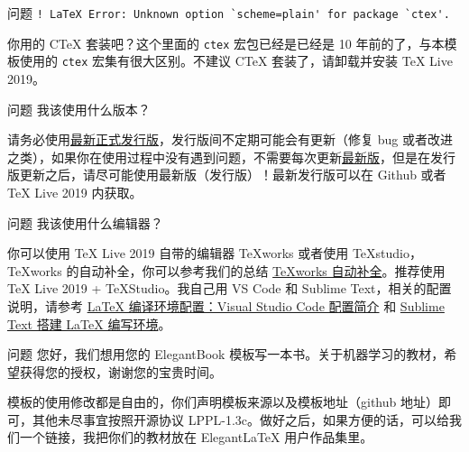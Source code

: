 	\begin{custom}{问题}
	\lstinline{! LaTeX Error: Unknown option `scheme=plain' for package `ctex'.}
	\end{custom}
	
	\begin{solution}
	你用的 C\TeX{} 套装吧？这个里面的 \lstinline{ctex} 宏包已经是已经是 10 年前的了，与本模板使用的 \lstinline{ctex} 宏集有很大区别。不建议 C\TeX{} 套装了，请卸载并安装 \TeX{} Live 2019。
	\end{solution}
	
	\begin{custom}{问题}
	我该使用什么版本？
	\end{custom}
	
	\begin{solution}
	请务必使用\href{https://github.com/ElegantLaTeX/ElegantBook/releases}{最新正式发行版}，发行版间不定期可能会有更新（修复 bug 或者改进之类），如果你在使用过程中没有遇到问题，不需要每次更新\href{https://github.com/ElegantLaTeX/ElegantBook/archive/master.zip}{最新版}，但是在发行版更新之后，请尽可能使用最新版（发行版）！最新发行版可以在 Github 或者 \TeX{} Live 2019 内获取。
	\end{solution}
	
	
	\begin{custom}{问题}
	我该使用什么编辑器？
	\end{custom}
	
	\begin{solution}
	你可以使用 \TeX{} Live 2019 自带的编辑器 \TeX{}works 或者使用 \TeX{}studio，\TeX works 的自动补全，你可以参考我们的总结 \href{https://github.com/EthanDeng/texworks-autocomplete}{\TeX works 自动补全}。推荐使用 \TeX{} Live 2019 + \TeX Studio。我自己用 VS Code 和 Sublime Text，相关的配置说明，请参考 \href{https://github.com/EthanDeng/vscode-latex}{\LaTeX{} 编译环境配置：Visual Studio Code 配置简介} 和 \href{https://github.com/EthanDeng/sublime-text-latex}{Sublime Text 搭建 \LaTeX{} 编写环境}。
	\end{solution}
	
	
	\begin{custom}{问题}
	您好，我们想用您的 ElegantBook 模板写一本书。关于机器学习的教材，希望获得您的授权，谢谢您的宝贵时间。
	\end{custom}
	
	\begin{solution}
	模板的使用修改都是自由的，你们声明模板来源以及模板地址（github 地址）即可，其他未尽事宜按照开源协议 LPPL-1.3c。做好之后，如果方便的话，可以给我们一个链接，我把你们的教材放在 ElegantLaTeX 用户作品集里。
	\end{solution}
	
